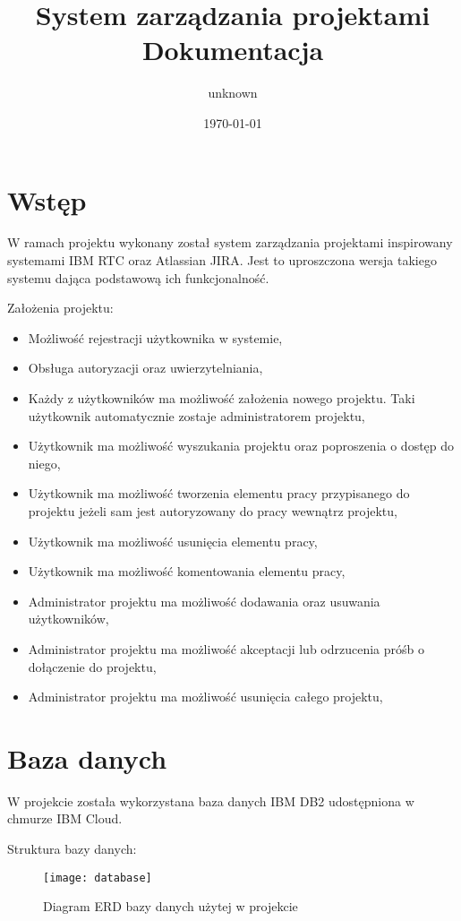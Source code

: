 \documentclass[11pt, titlepage]{article}
\title{System zarządzania projektami\\Dokumentacja}
\author{unknown}
\date{\today}
\begin{document}
\maketitle

\section{Wstęp}
\hspace{11pt} W ramach projektu wykonany został system zarządzania projektami inspirowany systemami IBM RTC oraz Atlassian JIRA. Jest to uproszczona wersja takiego systemu dająca podstawową ich funkcjonalność.

Założenia projektu:
\begin{itemize}
\item Możliwość rejestracji użytkownika w systemie,
\item Obsługa autoryzacji oraz uwierzytelniania,
\item Każdy z użytkowników ma możliwość założenia nowego projektu. Taki użytkownik automatycznie zostaje administratorem projektu,
\item Użytkownik ma możliwość wyszukania projektu oraz poproszenia o dostęp do niego,
\item Użytkownik ma możliwość tworzenia elementu pracy przypisanego do projektu jeżeli sam jest autoryzowany do pracy wewnątrz projektu,
\item Użytkownik ma możliwość usunięcia elementu pracy,
\item Użytkownik ma możliwość komentowania elementu pracy,
\item Administrator projektu ma możliwość dodawania oraz usuwania użytkowników,
\item Administrator projektu ma możliwość akceptacji lub odrzucenia próśb o dołączenie do projektu,
\item Administrator projektu ma możliwość usunięcia całego projektu,
\end{itemize}

\break

\section{Baza danych}
\hspace{11pt} W projekcie została wykorzystana baza danych IBM DB2 udostępniona w chmurze IBM Cloud.

Struktura bazy danych:
\begin{figure}[H]
\caption{Diagram ERD bazy danych użytej w projekcie}
\begin{adjustwidth}{-3cm}{}
\texttt{[image: database]}
\end{adjustwidth}
\end{figure}
\end{document}
